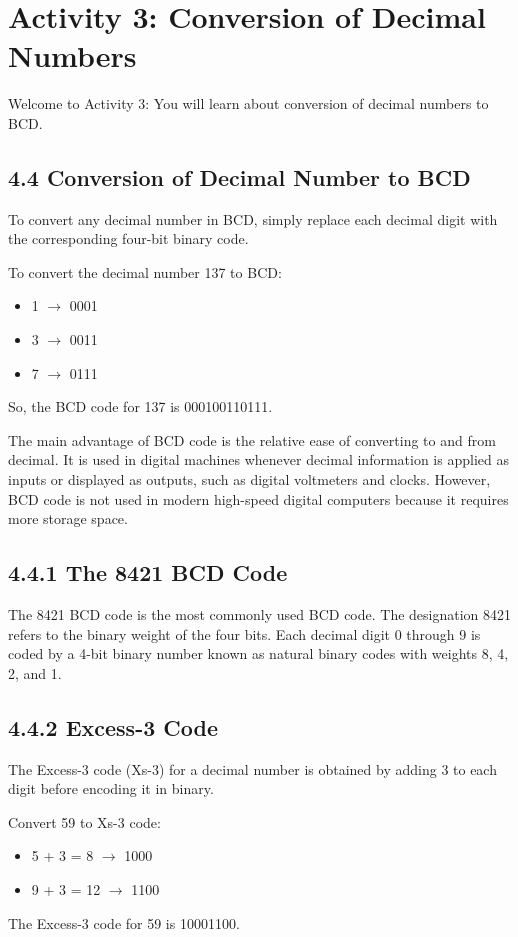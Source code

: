 \documentclass[12pt,a4paper]{article}
\begin{document}
\section*{Activity 3: Conversion of Decimal Numbers}
Welcome to Activity 3: You will learn about conversion of decimal numbers to BCD.

\subsection*{4.4 Conversion of Decimal Number to BCD}
To convert any decimal number in BCD, simply replace each decimal digit with the corresponding four-bit binary code.
\begin{example}
    To convert the decimal number 137 to BCD:
    \begin{itemize}
        \item 1 $\rightarrow$ 0001
        \item 3 $\rightarrow$ 0011
        \item 7 $\rightarrow$ 0111
    \end{itemize}
    So, the BCD code for 137 is 000100110111.
\end{example}

The main advantage of BCD code is the relative ease of converting to and from decimal. It is used in digital machines whenever decimal information is applied as inputs or displayed as outputs, such as digital voltmeters and clocks. However, BCD code is not used in modern high-speed digital computers because it requires more storage space.

\subsection*{4.4.1 The 8421 BCD Code}
The 8421 BCD code is the most commonly used BCD code. The designation 8421 refers to the binary weight of the four bits. Each decimal digit 0 through 9 is coded by a 4-bit binary number known as natural binary codes with weights 8, 4, 2, and 1.

\subsection*{4.4.2 Excess-3 Code}
The Excess-3 code (Xs-3) for a decimal number is obtained by adding 3 to each digit before encoding it in binary.
\begin{example}
    Convert 59 to Xs-3 code:
    \begin{itemize}
        \item 5 + 3 = 8 $\rightarrow$ 1000
        \item 9 + 3 = 12 $\rightarrow$ 1100
    \end{itemize}
    The Excess-3 code for 59 is 10001100.
\end{example}
\end{document}
